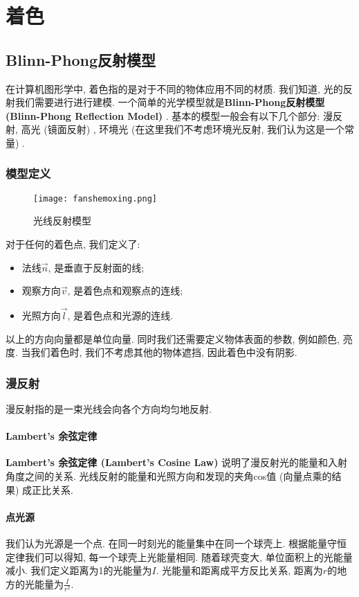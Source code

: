 
\part{着色}

\chapter{Blinn-Phong反射模型}
在计算机图形学中, 着色指的是对于不同的物体应用不同的材质. 我们知道, 光的反射我们需要进行进行建模. 一个简单的光学模型就是\textbf{Blinn-Phong反射模型 (Blinn-Phong Reflection Model) }. 基本的模型一般会有以下几个部分: 漫反射, 高光 (镜面反射) , 环境光 (在这里我们不考虑环境光反射, 我们认为这是一个常量) . 

\section{模型定义}
\begin{figure}[H]
	\centering
	\texttt{[image: fanshemoxing.png]}
	\caption{光线反射模型}
	\label{fig:fanshe}
\end{figure}
对于任何的着色点, 我们定义了: 
\begin{itemize}
	\item 法线$\overrightarrow{n}$, 是垂直于反射面的线; 
	\item 观察方向$\overrightarrow{v}$, 是着色点和观察点的连线; 
	\item 光照方向$\overrightarrow{l}$, 是着色点和光源的连线. 
\end{itemize}
以上的方向向量都是单位向量. 同时我们还需要定义物体表面的参数, 例如颜色, 亮度. 当我们着色时, 我们不考虑其他的物体遮挡, 因此着色中没有阴影. 

\section{漫反射}
漫反射指的是一束光线会向各个方向均匀地反射. 

\subsection{Lambert's 余弦定律}
\textbf{Lambert's 余弦定律 (Lambert's Cosine Law) }说明了漫反射光的能量和入射角度之间的关系. 光线反射的能量和光照方向和发现的夹角cos值 (向量点乘的结果) 成正比关系. 

\subsection{点光源}
我们认为光源是一个点. 在同一时刻光的能量集中在同一个球壳上. 根据能量守恒定律我们可以得知, 每一个球壳上光能量相同. 随着球壳变大, 单位面积上的光能量减小. 我们定义距离为1的光能量为$I$. 光能量和距离成平方反比关系, 距离为$r$的地方的光能量为$\frac{I}{r^2}$.

